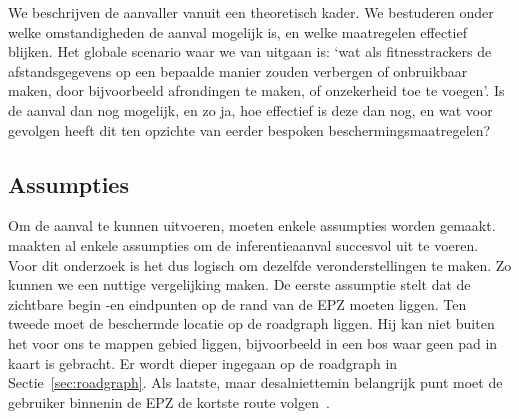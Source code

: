 We beschrijven de aanvaller vanuit een theoretisch kader. We bestuderen onder
welke omstandigheden de aanval mogelijk is, en welke maatregelen effectief
blijken. Het globale scenario waar we van uitgaan is: `wat als fitnesstrackers
de afstandsgegevens op een bepaalde manier zouden verbergen of onbruikbaar
maken, door bijvoorbeeld afrondingen te maken, of onzekerheid toe te voegen'.
Is de aanval dan nog mogelijk, en zo ja, hoe effectief is deze dan nog, en wat
voor gevolgen heeft dit ten opzichte van eerder bespoken
beschermingsmaatregelen?

\subsection{Assumpties}\label{sec:assumpties}
Om de aanval te kunnen uitvoeren, moeten enkele assumpties worden gemaakt.
\citeauthor{Dhondt} maakten al enkele assumpties om de inferentieaanval
succesvol uit te voeren. Voor dit onderzoek is het dus logisch om dezelfde
veronderstellingen te maken. Zo kunnen we een nuttige vergelijking maken. De
eerste assumptie stelt dat de zichtbare begin -en eindpunten op de rand van de
\ac{EPZ} moeten liggen. Ten tweede moet de beschermde locatie op de roadgraph
liggen. Hij kan niet buiten het voor ons te mappen gebied liggen, bijvoorbeeld
in een bos waar geen pad in kaart is gebracht. Er wordt dieper ingegaan op de
roadgraph in Sectie~\ref{sec:roadgraph}. Als laatste, maar desalniettemin
belangrijk punt moet de gebruiker binnenin de \ac{EPZ} de kortste route
volgen~\cite{Dhondt}.

